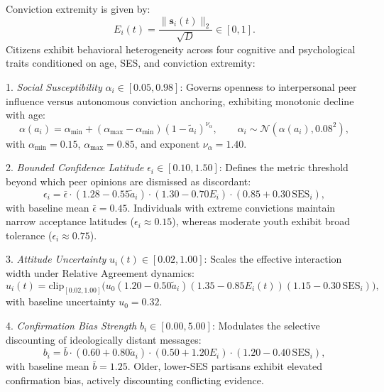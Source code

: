 \documentclass[11pt,a4paper]{article}
\begin{document}
Conviction extremity is given by:
\begin{equation}
    E_i(t) = \frac{\|\mathbf{s}_i(t)\|_2}{\sqrt{D}} \in [0, 1].
    \label{eq:individual_extremity}
\end{equation}
Citizens exhibit behavioral heterogeneity across four cognitive and psychological traits conditioned on age, SES, and conviction extremity:

1. \emph{Social Susceptibility} $\alpha_i \in [0.05, 0.98]$: Governs openness to interpersonal peer influence versus autonomous conviction anchoring, exhibiting monotonic decline with age:
\begin{equation}
    \alpha(a_i) = \alpha_{\min} + (\alpha_{\max} - \alpha_{\min})(1 - \tilde{a}_i)^{\nu_\alpha}, \qquad \alpha_i \sim \mathcal{N}(\alpha(a_i), 0.08^2),
    \label{eq:susceptibility}
\end{equation}
with $\alpha_{\min} = 0.15$, $\alpha_{\max} = 0.85$, and exponent $\nu_\alpha = 1.40$.

2. \emph{Bounded Confidence Latitude} $\epsilon_i \in [0.10, 1.50]$: Defines the metric threshold beyond which peer opinions are dismissed as discordant:
\begin{equation}
    \epsilon_i = \bar{\epsilon} \cdot (1.28 - 0.55\tilde{a}_i) \cdot (1.30 - 0.70 E_i) \cdot (0.85 + 0.30\,\mathrm{SES}_i),
    \label{eq:bounded_confidence}
\end{equation}
with baseline mean $\bar{\epsilon} = 0.45$. Individuals with extreme convictions maintain narrow acceptance latitudes ($\epsilon_i \approx 0.15$), whereas moderate youth exhibit broad tolerance ($\epsilon_i \approx 0.75$).

3. \emph{Attitude Uncertainty} $u_i(t) \in [0.02, 1.00]$: Scales the effective interaction width under Relative Agreement dynamics:
\begin{equation}
    u_i(t) = \mathrm{clip}_{[0.02, 1.00]}\big(u_0 (1.20 - 0.50\tilde{a}_i)(1.35 - 0.85 E_i(t))(1.15 - 0.30\,\mathrm{SES}_i)\big),
    \label{eq:uncertainty_update}
\end{equation}
with baseline uncertainty $u_0 = 0.32$.

4. \emph{Confirmation Bias Strength} $b_i \in [0.00, 5.00]$: Modulates the selective discounting of ideologically distant messages:
\begin{equation}
    b_i = \bar{b} \cdot (0.60 + 0.80\tilde{a}_i) \cdot (0.50 + 1.20 E_i) \cdot (1.20 - 0.40\,\mathrm{SES}_i),
    \label{eq:assimilation_bias}
\end{equation}
with baseline mean $\bar{b} = 1.25$. Older, lower-SES partisans exhibit elevated confirmation bias, actively discounting conflicting evidence.
\end{document}
